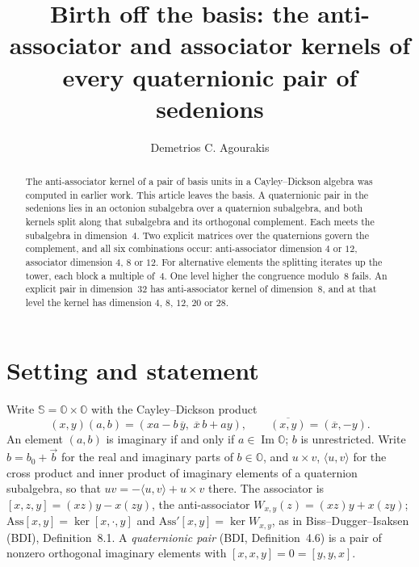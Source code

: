 \documentclass{baustms}
\theoremstyle{cupthm}
\numberwithin{equation}{section}
\newcommand{\Ass}{\mathrm{Ass}}
\newcommand{\OO}{\mathbb{O}}
\newcommand{\Sed}{\mathbb{S}}
\newcommand{\Imm}{\operatorname{Im}}
\begin{document}
\title{Birth off the basis: the anti-associator and associator kernels of every quaternionic pair of sedenions}
\cauthor
\author[1]{Demetrios C. Agourakis}
\address[1]{Pontif\'icia Universidade Cat\'olica de S\~ao Paulo, Sorocaba, Brazil, and Faculdade S\~ao Leopoldo Mandic, Campinas, Brazil. ORCID 0009-0001-8671-8878}

\begin{abstract}
The anti-associator kernel of a pair of basis units in a Cayley--Dickson algebra was computed in earlier work. This article leaves the basis. A quaternionic pair in the sedenions lies in an octonion subalgebra over a quaternion subalgebra, and both kernels split along that subalgebra and its orthogonal complement. Each meets the subalgebra in dimension~$4$. Two explicit matrices over the quaternions govern the complement, and all six combinations occur: anti-associator dimension $4$ or $12$, associator dimension $4$, $8$ or $12$. For alternative elements the splitting iterates up the tower, each block a multiple of~$4$. One level higher the congruence modulo~$8$ fails. An explicit pair in dimension~$32$ has anti-associator kernel of dimension~$8$, and at that level the kernel has dimension $4$, $8$, $12$, $20$ or $28$.
\end{abstract}


\maketitle

\section{Setting and statement}

Write $\Sed=\OO\times\OO$ with the Cayley--Dickson product
\begin{equation}
(x,y)(a,b)=(xa-b\,\overline{y},\;\overline{x}\,b+ay),\qquad \overline{(x,y)}=(\overline{x},-y).
\label{eq:mul}
\end{equation}
An element $(a,b)$ is imaginary if and only if $a\in\Imm\OO$; $b$ is unrestricted. Write $b=b_0+\vec{b}$ for the real and imaginary parts of $b\in\OO$, and $u\times v$, $\langle u,v\rangle$ for the cross product and inner product of imaginary elements of a quaternion subalgebra, so that $uv=-\langle u,v\rangle+u\times v$ there. The associator is $[x,z,y]=(xz)y-x(zy)$, the anti-associator $W_{x,y}(z)=(xz)y+x(zy)$; $\Ass[x,y]=\ker[x,\cdot,y]$ and $\Ass'[x,y]=\ker W_{x,y}$, as in Biss--Dugger--Isaksen \cite{bdi} (BDI), Definition~8.1. A \emph{quaternionic pair} (BDI, Definition~4.6) is a pair of nonzero orthogonal imaginary elements with $[x,x,y]=0=[y,y,x]$.
\end{document}

